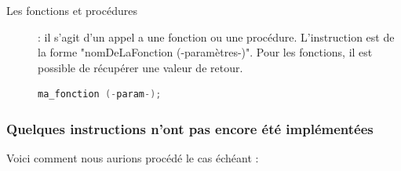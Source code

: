 \documentclass[11pt]{report} %
\begin{document}
\begin{description}

  \item[Les fonctions et procédures]: il s'agit d'un appel a une fonction ou une procédure. L'instruction est de la forme "nomDeLaFonction (-paramètres-)". Pour les fonctions, il est possible de récupérer une valeur de retour.

\begin{minipage}{\linewidth}
\begin{lstlisting}[caption=Fonctions et procédures, language=C]
ma_fonction (-param-);
\end{lstlisting}
\end{minipage}

\end{description}

\subsubsection{Quelques instructions n'ont pas encore été implémentées}
Voici comment nous aurions procédé le cas échéant : 
\end{document}
